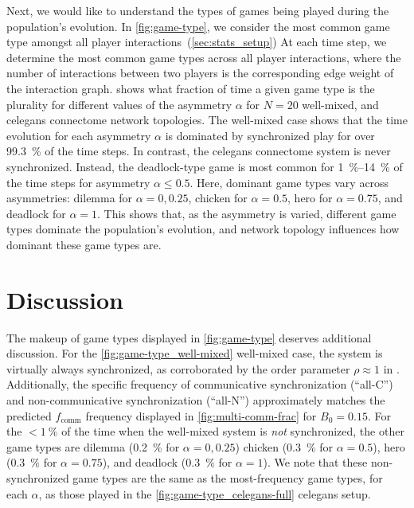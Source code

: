 \documentclass[pdflatex,lineno,referee,sn-nature]{sn-jnl}
\begin{document}
Next, we would like to understand the types of games being played
during the population's evolution.
In \cref{fig:game-type}, we consider the most common game type
amongst all player interactions~(\cf \cref{sec:stats_setup})
At each time step, we determine the most common game types
across all player interactions,
where the number of interactions between two players
is the corresponding edge weight of the interaction graph.
 shows what fraction of time
a given game type is the plurality for different values
of the asymmetry $\alpha$ for
$N=20$ well-mixed,
and
\gls{celegans} connectome
network topologies.
The  well-mixed case
shows that the time evolution for each asymmetry $\alpha$
is dominated by synchronized play
for over \SI{99.3}{\percent} of the time steps.
In contrast, the
 \gls{celegans} connectome system
is never synchronized.
Instead,
the deadlock-type game is most common
for \SIrange{1}{14}{\percent} of the time steps
for asymmetry $\alpha \le 0.5$.
Here, dominant game types
vary across asymmetries:
dilemma for $\alpha = 0, 0.25$, chicken for $\alpha = 0.5$,
hero for $\alpha = 0.75$, and deadlock for $\alpha = 1$.
This shows that, as the asymmetry is varied,
different game types dominate the population's evolution,
and network topology influences how dominant these game types are.

\section{Discussion}
\label{sec:discussion}

The makeup of game types displayed in \cref{fig:game-type}
deserves additional discussion.
For the \cref{fig:game-type_well-mixed} well-mixed case,
the system is virtually always synchronized,
as corroborated by the order parameter $\rho \approx 1$ in
.
Additionally, the specific frequency of communicative synchronization (``all-C'')
and non-communicative synchronization (``all-N'')
approximately matches the predicted $f_{\text{comm}}$
frequency displayed in \cref{fig:multi-comm-frac} for $B_0=0.15$.
For the $< \SI{1}{\percent}$ of the time when the well-mixed system is
\emph{not} synchronized, the other game types are
dilemma (\SI{0.2}{\percent} for $\alpha = 0, 0.25$)
chicken (\SI{0.3}{\percent} for $\alpha = 0.5$),
hero (\SI{0.3}{\percent} for $\alpha = 0.75$),
and
deadlock (\SI{0.3}{\percent} for $\alpha = 1$).
We note that these non-synchronized game types
are the same as the most-frequency game types,
for each $\alpha$, as those played in
the \cref{fig:game-type_celegans-full} \gls{celegans} setup.
\end{document}
